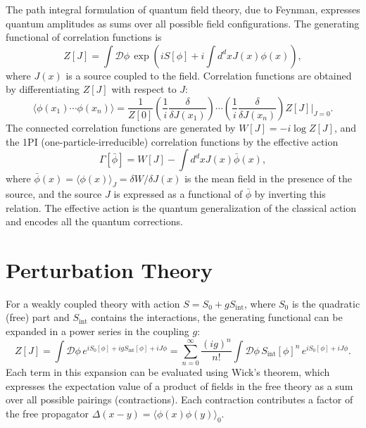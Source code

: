 \documentclass[11pt, twoside, openright]{book}
\theoremstyle{dotted}
\theoremstyle{definition}
\begin{document}
The path integral formulation of quantum field theory, due to Feynman, expresses
quantum amplitudes as sums over all possible field configurations. The generating
functional of correlation functions is
\begin{equation}
  Z[J] = \int \mathcal{D}\phi \, \exp\!\left(iS[\phi] + i\int d^dx J(x)\phi(x)\right),
  \label{eq:gen_functional}
\end{equation}
where $J(x)$ is a source coupled to the field. Correlation functions are obtained
by differentiating $Z[J]$ with respect to $J$:
\begin{equation}
  \langle\phi(x_1)\cdots\phi(x_n)\rangle
  = \frac{1}{Z[0]}\left(\frac{1}{i}\frac{\delta}{\delta J(x_1)}\right)
  \cdots\left(\frac{1}{i}\frac{\delta}{\delta J(x_n)}\right)Z[J]\bigg|_{J=0}.
  \label{eq:correlation_from_Z}
\end{equation}
The connected correlation functions are generated by $W[J] = -i\log Z[J]$, and
the 1PI (one-particle-irreducible) correlation functions by the effective action
\begin{equation}
  \Gamma[\bar\phi] = W[J] - \int d^dx J(x)\bar\phi(x),
  \label{eq:effective_action}
\end{equation}
where $\bar\phi(x) = \langle\phi(x)\rangle_J = \delta W/\delta J(x)$ is the mean
field in the presence of the source, and the source $J$ is expressed as a functional
of $\bar\phi$ by inverting this relation. The effective action is the quantum
generalization of the classical action and encodes all the quantum corrections.

\section{Perturbation Theory}

For a weakly coupled theory with action $S = S_0 + gS_{\text{int}}$, where $S_0$
is the quadratic (free) part and $S_{\text{int}}$ contains the interactions, the
generating functional can be expanded in a power series in the coupling $g$:
\begin{equation}
  Z[J] = \int \mathcal{D}\phi \, e^{iS_0[\phi] + igS_{\text{int}}[\phi] + iJ\phi}
  = \sum_{n=0}^\infty \frac{(ig)^n}{n!}
  \int \mathcal{D}\phi \, S_{\text{int}}[\phi]^n \, e^{iS_0[\phi] + iJ\phi}.
  \label{eq:perturbation_expansion}
\end{equation}
Each term in this expansion can be evaluated using Wick's theorem, which expresses
the expectation value of a product of fields in the free theory as a sum over all
possible pairings (contractions). Each contraction contributes a factor of the
free propagator $\Delta(x-y) = \langle\phi(x)\phi(y)\rangle_0$.
\end{document}
